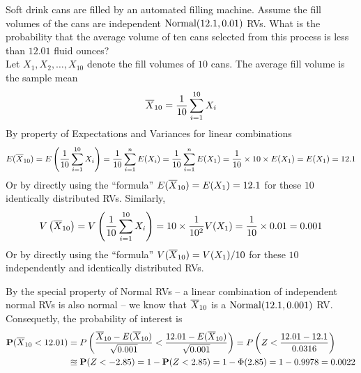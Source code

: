 \begin{ExerciseList}
\Exercise
Soft drink cans are filled by an automated filling machine.  
Assume the fill volumes of the cans are independent $\mbox{{\rm Normal}}(12.1,0.01)$ RVs.  
What is the probability that the average volume of ten cans selected from this process is less than $12.01$ fluid ounces?
\Answer
~\\
Let $X_1,X_2,\ldots,X_{10}$ denote the fill volumes of $10$ cans.  The average fill volume is the sample mean
\[
\overline{X}_{10} = \frac{1}{10} \sum_{i=1}^{10} X_i
\]
By property of Expectations and Variances for linear combinations
\[
E(\overline{X}_{10}) = E \left(\frac{1}{10} \sum_{i=1}^{10} X_i \right) = \frac{1}{10}\sum_{i=1}^nE(X_i) = \frac{1}{10}\sum_{i=1}^nE(X_1) = \frac{1}{10} \times 10 \times E(X_1) = E(X_1) = 12.1
\]
Or by directly using the ``formula'' $E(\overline{X}_{10}) = E(X_1)=12.1$ for these $10$ identically distributed RVs.  
Similarly, 
\[
V\left(\overline{X}_{10}\right) = V \left(\frac{1}{10} \sum_{i=1}^{10} X_i \right) = 10 \times \frac{1}{10^2} V(X_1) = \frac{1}{10} \times 0.01 = 0.001 
\]
Or by directly using the ``formula'' $V(\overline{X}_{10}) = V(X_1)/10$ for these $10$ independently and identically distributed RVs.
 
By the special property of Normal RVs -- a linear combination of independent normal RVs is also normal -- we know that 
$\overline{X}_{10}$ is a $\mbox{{\rm Normal}}(12.1,0.001)$ RV.
Consequetly, the probability of interest is
\begin{align*}
\mathbf{P}(\overline{X}_{10} < 12.01) 
&= P \left( \frac{\overline{X}_{10}-E(\overline{X}_{10})}{\sqrt{0.001}} < \frac{12.01 - E(\overline{X}_{10})}{\sqrt{0.001}} \right) = P\left(Z < \frac{12.01-12.1}{0.0316}\right)\\ 
&\approxeq \mathbf{P}(Z<-2.85) = 1-\mathbf{P}(Z<2.85) = 1-\Phi(2.85) = 1-0.9978=0.0022
\end{align*}


\end{ExerciseList}
